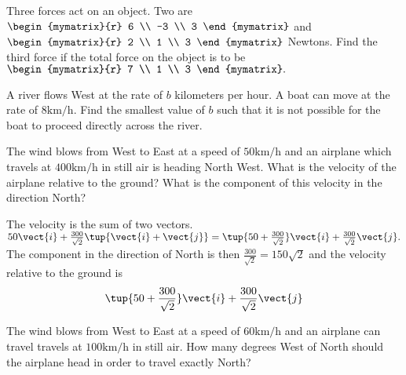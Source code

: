 \begin{enumialphparenastyle}
\begin{ex} Three forces act on an object. Two are $\begin{mymatrix}{r}
6 \\
-3 \\
3
\end{mymatrix} $ and $\begin{mymatrix}{r}
2 \\
1 \\
3
\end{mymatrix} $ Newtons. Find the third force if the total force on the object is
to be $\begin{mymatrix}{r}
7 \\
1 \\
3
\end{mymatrix} .$ \vspace{1mm}
\end{ex}

\begin{ex} A river flows West at the rate of $b$ kilometers per hour. A boat can move
at the rate of $8\textrm{km}/\textrm{h}$. Find the smallest value of $b$ such that
it is not possible for the boat to proceed directly across the river.
\vspace{1mm}
\end{ex}

\begin{ex} The wind blows from West to East at a speed of $50\textrm{km}/\textrm{h}$ and
an airplane which travels at $400\textrm{km}/\textrm{h}$ in still air is heading
North West. What is the velocity of the airplane relative to the ground?
What is the component of this velocity in the direction North? \vspace{1mm}
\begin{sol}
The velocity is the sum of two vectors. $50\vect{i}+\frac{
300}{\sqrt{2}} \tup{\vect{i}+\vect{j}} =\tup{50+\frac{300}{\sqrt{2}}
} \vect{i}+ \frac{300}{\sqrt{2}}\vect{j}.$ The component in the
direction of North is then $\frac{300}{\sqrt{2}}= 150\sqrt{2}$
and the velocity relative to the ground is
\[
\tup{50+\frac{300}{\sqrt{2}}} \vect{i}+\frac{300}{\sqrt{2}}\vect{j}
\]
\end{sol}
\end{ex}

\begin{ex} The wind blows from West to East at a speed of $60\textrm{km}/\textrm{h}$ and
an airplane can travel travels at $100\textrm{km}/\textrm{h}$ in still air. How
many degrees West of North should the airplane head in order to travel
exactly North? \vspace{1mm}
\end{ex}



\end{enumialphparenastyle}
